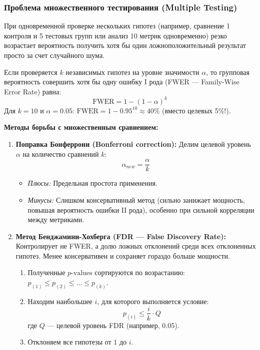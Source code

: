 \documentclass[12pt]{article}
\begin{document}
\subsubsection{Проблема множественного тестирования (Multiple Testing)}

При одновременной проверке нескольких гипотез (например, сравнение 1 контроля и 5 тестовых групп или анализ 10 метрик одновременно) резко возрастает вероятность получить хотя бы один ложноположительный результат просто за счет случайного шума.

Если проверяется $k$ независимых гипотез на уровне значимости $\alpha$, то групповая вероятность совершить хотя бы одну ошибку I рода (FWER --- Family-Wise Error Rate) равна:
\begin{equation}
    \text{FWER} = 1 - (1 - \alpha)^k
\end{equation}
Для $k = 10$ и $\alpha = 0.05$: $\text{FWER} = 1 - 0.95^{10} \approx 40\%$ (вместо целевых 5\%!).

\textbf{Методы борьбы с множественным сравнением:}
\begin{enumerate}
    \item \textbf{Поправка Бонферрони (Bonferroni correction):}
    Делим целевой уровень $\alpha$ на количество сравнений $k$:
    \begin{equation}
        \alpha_{new} = \frac{\alpha}{k}
    \end{equation}
    \begin{itemize}
        \item \textit{Плюсы:} Предельная простота применения.
        \item \textit{Минусы:} Слишком консервативный метод (сильно занижает мощность, повышая вероятность ошибки II рода), особенно при сильной корреляции между метриками.
    \end{itemize}
    
    \item \textbf{Метод Бенджамини-Хохберга (FDR --- False Discovery Rate):}
    Контролирует не FWER, а долю ложных отклонений среди всех отклоненных гипотез. Менее консервативен и сохраняет гораздо больше мощности.
    \begin{enumerate}
        \item Полученные $p\text{-values}$ сортируются по возрастанию: $p_{(1)} \le p_{(2)} \le \dots \le p_{(k)}$.
        \item Находим наибольшее $i$, для которого выполняется условие:
        \begin{equation}
            p_{(i)} \le \frac{i}{k} \cdot Q
        \end{equation}
        где $Q$ --- целевой уровень FDR (например, 0.05).
        \item Отклоняем все гипотезы от $1$ до $i$.
    \end{enumerate}
\end{enumerate}
\end{document}
